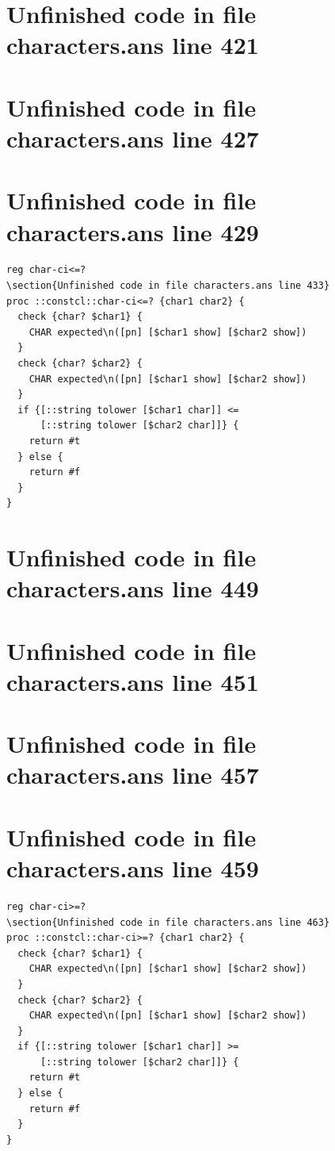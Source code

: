 \documentclass[twoside,9pt]{report}
\begin{document}
\section{Unfinished code in file characters.ans line 421}
\section{Unfinished code in file characters.ans line 427}
\section{Unfinished code in file characters.ans line 429}
\begin{lstlisting}
reg char-ci<=?
\section{Unfinished code in file characters.ans line 433}
proc ::constcl::char-ci<=? {char1 char2} {
  check {char? $char1} {
    CHAR expected\n([pn] [$char1 show] [$char2 show])
  }
  check {char? $char2} {
    CHAR expected\n([pn] [$char1 show] [$char2 show])
  }
  if {[::string tolower [$char1 char]] <=
      [::string tolower [$char2 char]]} {
    return #t
  } else {
    return #f
  }
}
\end{lstlisting}
\section{Unfinished code in file characters.ans line 449}
\section{Unfinished code in file characters.ans line 451}
\section{Unfinished code in file characters.ans line 457}
\section{Unfinished code in file characters.ans line 459}
\begin{lstlisting}
reg char-ci>=?
\section{Unfinished code in file characters.ans line 463}
proc ::constcl::char-ci>=? {char1 char2} {
  check {char? $char1} {
    CHAR expected\n([pn] [$char1 show] [$char2 show])
  }
  check {char? $char2} {
    CHAR expected\n([pn] [$char1 show] [$char2 show])
  }
  if {[::string tolower [$char1 char]] >=
      [::string tolower [$char2 char]]} {
    return #t
  } else {
    return #f
  }
}
\end{lstlisting}
\end{document}
